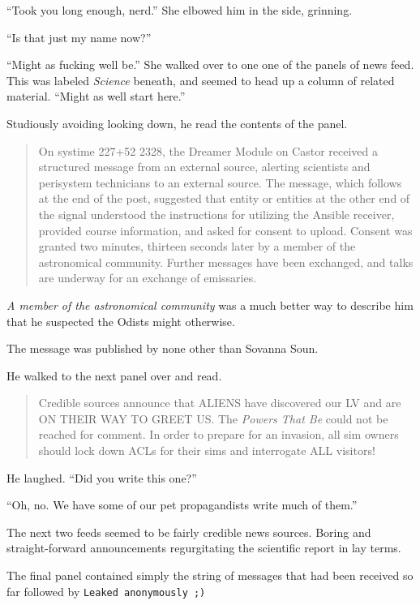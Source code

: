 ``Took you long enough, nerd.'' She elbowed him in the side, grinning.

``Is that just my name now?''

``Might as fucking well be.'' She walked over to one one of the panels of news feed. This was labeled \emph{Science} beneath, and seemed to head up a column of related material. ``Might as well start here.''

Studiously avoiding looking down, he read the contents of the panel.

\begin{quote}
On systime 227+52 2328, the Dreamer Module on Castor received a structured message from an external source, alerting scientists and perisystem technicians to an external source. The message, which follows at the end of the post, suggested that entity or entities at the other end of the signal understood the instructions for utilizing the Ansible receiver, provided course information, and asked for consent to upload. Consent was granted two minutes, thirteen seconds later by a member of the astronomical community. Further messages have been exchanged, and talks are underway for an exchange of emissaries.
\end{quote}

\emph{A member of the astronomical community} was a much better way to describe him that he suspected the Odists might otherwise.

The message was published by none other than Sovanna Soun.

He walked to the next panel over and read.

\begin{quote}
Credible sources announce that ALIENS have discovered our LV and are ON THEIR WAY TO GREET US. The \emph{Powers That Be} could not be reached for comment. In order to prepare for an invasion, all sim owners should lock down ACLs for their sims and interrogate ALL visitors!
\end{quote}

He laughed. ``Did you write this one?''

``Oh, no. We have some of our pet propagandists write much of them.''

The next two feeds seemed to be fairly credible news sources. Boring and straight-forward announcements regurgitating the scientific report in lay terms.

The final panel contained simply the string of messages that had been received so far followed by \texttt{Leaked\ anonymously\ ;)}

